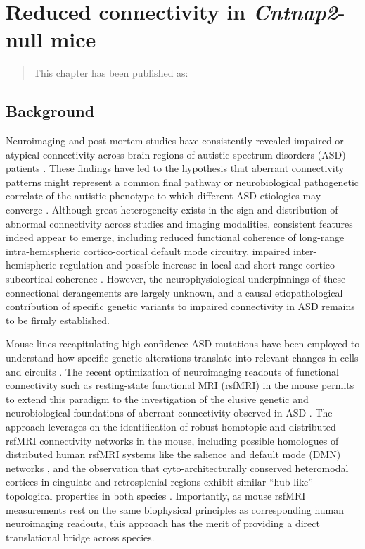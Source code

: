 \chapter{Reduced connectivity in \textit{Cntnap2}-null mice}

\label{Chapter03}

\begin{quote}
    This chapter has been published as:

\end{quote}

\section{Background}

Neuroimaging and post-mortem studies have consistently revealed impaired or
atypical connectivity across brain regions of autistic spectrum disorders (ASD)
patients \parencite{anagnostou2011}. These findings have led to the hypothesis
that aberrant connectivity patterns might represent a common final pathway or
neurobiological pathogenetic correlate of the autistic phenotype to which
different ASD etiologies may converge \parencite{just2012}. Although great
heterogeneity exists in the sign and distribution of abnormal connectivity
across studies and imaging modalities, consistent features indeed appear to
emerge, including reduced functional coherence of long-range intra-hemispheric
cortico-cortical default mode circuitry, impaired inter-hemispheric regulation
and possible increase in local and short-range cortico-subcortical coherence
\parencite{rane2015}.  However, the neurophysiological underpinnings of these connectional
derangements are largely unknown, and a causal etiopathological contribution of
specific genetic variants to impaired connectivity in ASD remains to be firmly
established. 

Mouse lines recapitulating high-confidence ASD mutations \parencite{sanders2015}
have been employed to understand how specific genetic alterations translate into
relevant changes in cells and circuits \parencite{auerbach2011}. The recent
optimization of neuroimaging readouts of functional connectivity such as
resting-state functional MRI (rsfMRI) in the mouse \parencite{sforazzini2014}
permits to extend this paradigm to the investigation of the elusive genetic and
neurobiological foundations of aberrant connectivity observed in ASD
\parencite{liska2016}. The approach leverages on the identification of robust
homotopic and distributed rsfMRI connectivity networks in the mouse, including
possible homologues of distributed human rsfMRI systems like the salience and
default mode (DMN) networks \parencite{gozzi2016}, and the observation that
cyto-architecturally conserved heteromodal cortices in cingulate and
retrosplenial regions exhibit similar “hub-like” topological properties in both
species \parencite{cole2010, liska2015}. Importantly, as mouse rsfMRI
measurements rest on the same biophysical principles as corresponding human
neuroimaging readouts, this approach has the merit of providing a direct
translational bridge across species. 


